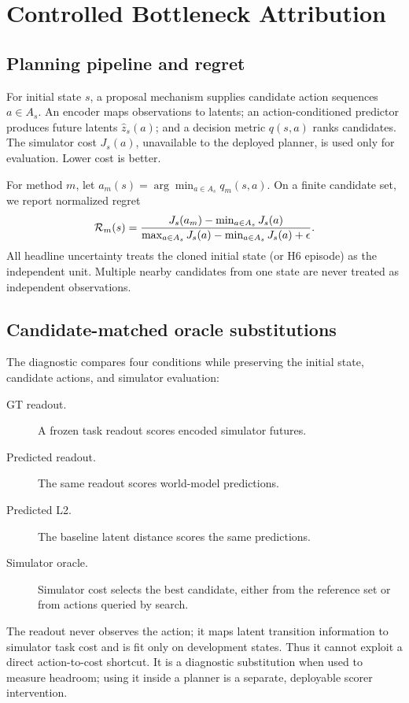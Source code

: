 \section{Controlled Bottleneck Attribution}
\label{sec:method}

\subsection{Planning pipeline and regret}

For initial state $s$, a proposal mechanism supplies candidate action sequences $a\in A_s$. An encoder maps observations to latents; an action-conditioned predictor produces future latents $\hat z_s(a)$; and a decision metric $q(s,a)$ ranks candidates. The simulator cost $J_s(a)$, unavailable to the deployed planner, is used only for evaluation. Lower cost is better.

For method $m$, let $a_m(s)=\arg\min_{a\in A_s}q_m(s,a)$. On a finite candidate set, we report normalized regret
\begin{equation}
\mathcal{R}_m(s)=\frac{J_s(a_m)-\min_{a\in A_s}J_s(a)}
{\max_{a\in A_s}J_s(a)-\min_{a\in A_s}J_s(a)+\epsilon}.
\label{eq:regret}
\end{equation}
All headline uncertainty treats the cloned initial state (or H6 episode) as the independent unit. Multiple nearby candidates from one state are never treated as independent observations.

\subsection{Candidate-matched oracle substitutions}

The diagnostic compares four conditions while preserving the initial state, candidate actions, and simulator evaluation:
\begin{description}
  \item[GT readout.] A frozen task readout scores encoded simulator futures.
  \item[Predicted readout.] The same readout scores world-model predictions.
  \item[Predicted L2.] The baseline latent distance scores the same predictions.
  \item[Simulator oracle.] Simulator cost selects the best candidate, either from the reference set or from actions queried by search.
\end{description}
The readout never observes the action; it maps latent transition information to simulator task cost and is fit only on development states. Thus it cannot exploit a direct action-to-cost shortcut. It is a diagnostic substitution when used to measure headroom; using it inside a planner is a separate, deployable scorer intervention.

